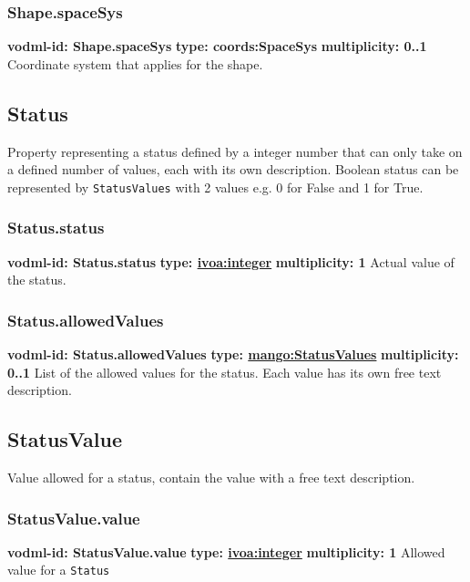     \subsubsection{Shape.spaceSys}
      \textbf{vodml-id: Shape.spaceSys} \newline
      \textbf{type: coords:SpaceSys} \newline
      \textbf{multiplicity: 0..1} \newline 
      Coordinate system that applies for the shape.

  \subsection{Status}
  \label{sect:Status}
    Property representing a status defined by a integer number that can only take on a defined number of values, each with its own description. Boolean status can be represented by \texttt{StatusValues} with 2 values e.g. 0 for False and 1 for True.

    \subsubsection{Status.status}
      \textbf{vodml-id: Status.status} \newline
      \textbf{type: \hyperref[sect:ivoa]{ivoa:integer}} \newline
      \textbf{multiplicity: 1} \newline 
      Actual value of the status.

    \subsubsection{Status.allowedValues}
      \textbf{vodml-id: Status.allowedValues} \newline
      \textbf{type: \hyperref[sect:StatusValues]{mango:StatusValues}} \newline
      \textbf{multiplicity: 0..1} \newline 
      List of the allowed values for the status. Each value has its own free text description.

  \subsection{StatusValue}
  \label{sect:StatusValue}
    Value allowed for a status, contain the value with a free text description.

    \subsubsection{StatusValue.value}
      \textbf{vodml-id: StatusValue.value} \newline
      \textbf{type: \hyperref[sect:ivoa]{ivoa:integer}} \newline
      \textbf{multiplicity: 1} \newline 
      Allowed value for a \texttt{Status}

